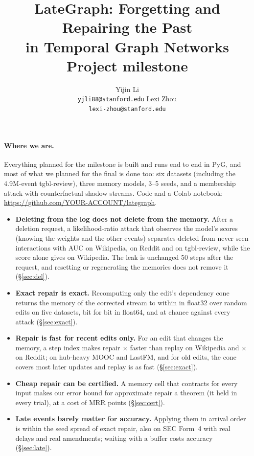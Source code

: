 \documentclass{article}
\title{LateGraph: Forgetting and Repairing the Past\\ in Temporal Graph Networks\\[3pt]
\normalsize Project milestone}
\author{%
  Yijin Li\\ \texttt{yjli88@stanford.edu}
  \And
  Lexi Zhou\\ \texttt{lexi-zhou@stanford.edu}
}
\newcommand{\CodeURL}{https://github.com/YOUR-ACCOUNT/lategraph}
\begin{document}
\maketitle

\vspace{-1.5em}
\paragraph{Where we are.} Everything planned for the milestone is built and runs end to end in PyG, and most of what we
planned for the final is done too: six datasets (including the 4.9M-event tgbl-review), three memory models, 3--5 seeds,
and a membership attack with counterfactual shadow streams. Code and a Colab notebook: \url{\CodeURL}.
\begin{itemize}
\item \textbf{Deleting from the log does not delete from the memory.} After a deletion request, a likelihood-ratio
  attack that observes the model's scores (knowing the weights and the other events) separates deleted from never-seen
  interactions with AUC \LiraQStoreWiki{} on Wikipedia, \LiraQStoreReddit{} on Reddit and \LiraQStoreReview{} on tgbl-review,
  while the score alone gives \RawStoreWiki{} on Wikipedia. The leak is unchanged 50 steps after the request, and resetting
  or regenerating the memories does not remove it (\S\ref{sec:del}).
\item \textbf{Exact repair is exact.} Recomputing only the edit's dependency cone returns the memory of the corrected
  stream to within \ExMaxAll{} in float32 over \ExTotalAll{} random edits on five datasets, bit for bit in float64, and at
  chance against every attack (\S\ref{sec:exact}).
\item \textbf{Repair is fast for recent edits only.} For an edit that changes the memory, a step index makes repair
  \BenchSpeedEffWiki$\times$ faster than replay on Wikipedia and \BenchSpeedEffReddit$\times$ on Reddit; on hub-heavy MOOC
  and LastFM, and for old edits, the cone covers most later updates and replay is as fast (\S\ref{sec:exact}).
\item \textbf{Cheap repair can be certified.} A memory cell that contracts for every input makes our error bound for
  approximate repair a theorem (it held in every trial), at a cost of \MrrLossNineCell{} MRR points (\S\ref{sec:cert}).
\item \textbf{Late events barely matter for accuracy.} Applying them in arrival order is within the seed spread of exact
  repair, also on SEC Form~4 with real delays and \SecAmend{} real amendments; waiting with a buffer costs accuracy
  (\S\ref{sec:late}).
\end{itemize}
\end{document}
